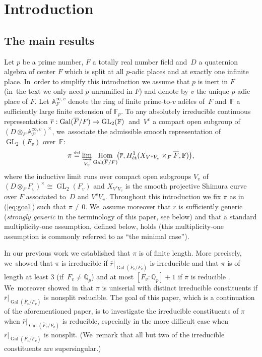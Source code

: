 \documentclass[JEP,XML,SOM,Unicode,NoFloatCountersInSection, NoEqCountersInSection,published]{cedram}
\let\ovl\overline
\newcommand{\defeq}{\stackrel{\textrm{\tiny{\upshape{def}}}}{=}}
\newcommand{\F}{\mathbb{F}}
\newcommand{\Fp}{\mathbb{F}_{p}}
\newcommand{\Qp}{\mathbb{Q}_{p}}
\newcommand{\rbar}{\overline{r}}
\DeclareMathOperator{\Gal}{Gal}
\DeclareMathOperator{\GL}{GL}
\DeclareMathOperator{\Hom}{Hom}
\theoremstyle{plain}
\theoremstyle{definition}
\begin{document}
\vspace*{-\baselineskip}
\tableofcontents
\mainmatter

\section{Introduction}
\label{sec:introduction}

\subsection{The main results}
\label{sec:results}

Let $p$ be a prime number, $F$ a totally real number field and~$D$ a quaternion algebra of center $F$ which is split at all $p$-adic places and at exactly one infinite place. In~order to simplify this introduction we assume that $p$ is inert in $F$ (in~the text we only need $p$ unramified in $F$) and denote by $v$ the unique $p$-adic place of $F$.
Let ${\mathbb A}_F^{\infty,v}$ denote the ring of finite prime-to-$v$ adèles of~$F$ and~$\F$ a sufficiently large finite extension of $\Fp$.
To any absolutely irreducible continuous representation \hbox{$\rbar: {\rm Gal}(\overline F/F)\to\GL_2(\F)$ and $V^v$} a compact open subgroup of \hbox{$(D\otimes_F{\mathbb A}_F^{\infty,v})^\times$}, we~associate the admissible smooth representation of $\GL_2(F_v)$ over~$\F$:
\begin{equation}\label{eq:goal}
\pi\defeq \varinjlim_{V_v}\Hom_{{\rm Gal}(\overline F/F)}\!\bigl(\rbar,H^1_{\textup{ét}}(X_{V^vV_v} \times_F \overline F, \F)\bigr),
\end{equation}
where the inductive limit runs over compact open subgroups $V_v$ of $(D\otimes_FF_v)^\times\cong \GL_2(F_v)$ and $X_{V^vV_v}$ is the smooth projective Shimura curve over $F$ associated to~$D$ and $V^vV_v$.
Throughout this introduction we fix $\pi$ as in (\ref{eq:goal}) such that $\pi\ne 0$. We~assume moreover that $\rbar$ is sufficiently generic (\emph{strongly generic} in the terminology of this paper, see below) and that a standard multiplicity-one assumption, defined below, holds (this multiplicity-one assumption is commonly referred to as ``the minimal case'').

In our previous work we established that $\pi$ is of finite length.
More precisely, we~showed that $\pi$ is irreducible if $\rbar\vert_{\Gal(\ovl F_v/F_v)}$ is irreducible \cite[Th.\,3.105(i)]{BHHMS2}
and that $\pi$ is of length at least 3 (if~$F_v \ne \Qp$) and at most $[F_v:\Qp]+1$ if $\pi$ is reducible \cite[Th.\,1.1.1]{BHHMS4}. We~moreover showed in \loccit that $\pi$ is uniserial with distinct irreducible constituents if $\rbar\vert_{\Gal(\ovl F_v/F_v)}$ is nonsplit reducible.
The goal of this paper, which is a continuation of the aforementioned paper, is to investigate the irreducible constituents of $\pi$ when $\rbar\vert_{\Gal(\ovl F_v/F_v)}$ is reducible, especially in the more difficult case when $\rbar\vert_{\Gal(\ovl F_v/F_v)}$ is nonsplit.
(We~remark that all but two of the irreducible constituents are supersingular.)
\end{document}
